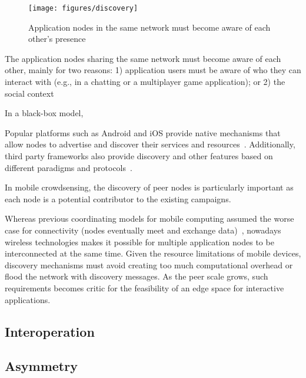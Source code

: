 \begin{figure}[t!]
	\centering
	\texttt{[image: figures/discovery]}
	\caption{Application nodes in the same network must become aware of each other's presence}
	\label{fig:discovery}
\end{figure}


The application nodes sharing the same network must become aware of each other, mainly for two reasons: 1) application users must be aware of who they can interact with (e.g., in a chatting or a multiplayer game application); or 2) the social context  

In a black-box model, 


Popular platforms such as Android and iOS provide native mechanisms that allow nodes to advertise and discover their services and resources~\cite{ANDROID_NSD, IOS_Bonjour}. Additionally, third party frameworks also provide discovery and other features based on different paradigms and protocols~\cite{Alljoyn, IoTivity}. 

In mobile crowdsensing, the discovery of peer nodes is particularly important as each node is a potential contributor to the existing campaigns. 


Whereas previous coordinating models for mobile computing assumed the worse case for connectivity (nodes eventually meet and exchange data)~\cite{LIME, TUCSON, OTHERS}, nowadays wireless technologies makes it possible for multiple application nodes to be interconnected at the same time. Given the resource limitations of mobile devices, discovery mechanisms must avoid creating too much computational overhead or flood the network with discovery messages. As the peer scale grows, such requirements becomes critic for the feasibility of an edge space for interactive applications. 

\subsection{Interoperation}



\subsection{Asymmetry}

